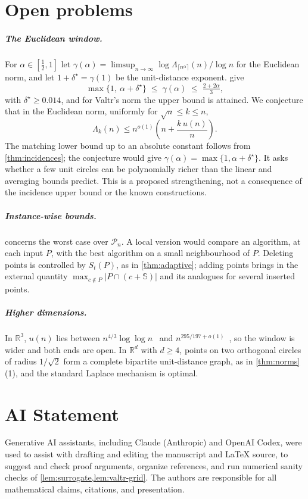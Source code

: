 \documentclass[anonymous,a4paper,USenglish,cleveref,autoref,thm-restate]{socg-lipics-v2021}
\newcommand{\R}{\mathbb{R}}
\newcommand{\cP}{\mathcal{P}}
\newcommand{\Lam}{\Lambda}
\begin{document}
\section{Open problems}
\label{sec:open}

\subparagraph*{The Euclidean window.}
For $\alpha\in[\frac12,1]$ let $\gamma(\alpha)=\limsup_{n\to\infty}\log\Lam_{\lceil n^{\alpha}\rceil}(n)/\log n$ for the Euclidean norm, and let $1+\delta^\star=\gamma(1)$ be the unit-distance exponent.  give
\[
  \max\{1,\ \alpha+\delta^\star\}\;\le\;\gamma(\alpha)\;\le\;\tfrac{2+2\alpha}{3},
\]
with $\delta^\star\ge0.014$, and for Valtr's norm the upper bound is attained. We conjecture that in the Euclidean norm, uniformly for $\sqrt n\le k\le n$,
\[
  \Lam_k(n)\le n^{o(1)}\left(n+\frac{k\,u(n)}{n}\right).
\]
The matching lower bound up to an absolute constant follows from \cref{thm:incidences}; the conjecture would give $\gamma(\alpha)=\max\{1,\alpha+\delta^\star\}$. It asks whether a few unit circles can be polynomially richer than the linear and averaging bounds predict. This is a proposed strengthening, not a consequence of the incidence upper bound or the known constructions.

\subparagraph*{Instance-wise bounds.}
 concerns the worst case over $\cP_n$. A local version would compare an algorithm, at each input $P$, with the best algorithm on a small neighbourhood of $P$. Deleting points is controlled by $S_t(P)$, as in \cref{thm:adaptive}; adding points brings in the external quantity $\max_{c\notin P}|P\cap(c+\mathbb S)|$ and its analogues for several inserted points.

\subparagraph*{Higher dimensions.}
In $\R^3$, $u(n)$ lies between $n^{4/3}\log\log n$~\cite{BrassMoserPach05} and $n^{295/197+o(1)}$~\cite{Zahl19}, so the window is wider and both ends are open. In $\R^d$ with $d\ge4$, points on two orthogonal circles of radius $1/\sqrt2$ form a complete bipartite unit-distance graph, as in \cref{thm:norms}(1), and the standard Laplace mechanism is optimal.



\section*{AI Statement}
Generative AI assistants, including Claude (Anthropic) and OpenAI Codex, were used to assist with drafting and editing the manuscript and \LaTeX{} source, to suggest and check proof arguments, organize references, and run numerical sanity checks of \cref{lem:surrogate,lem:valtr-grid}. The authors are responsible for all mathematical claims, citations, and presentation.
\end{document}
